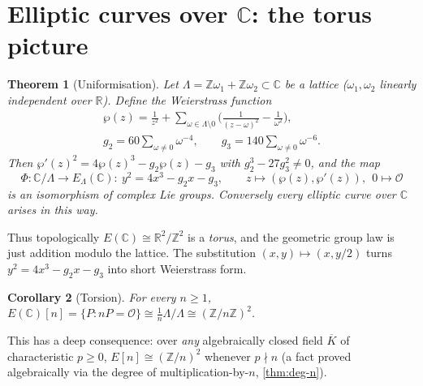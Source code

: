 \documentclass[11pt,a4paper,oneside]{book}
\theoremstyle{plain}
\newtheorem{theorem}{Theorem}[chapter]
\newtheorem{corollary}[theorem]{Corollary}
\theoremstyle{definition}
\theoremstyle{remark}
\newcommand{\Z}{\mathbb{Z}}
\newcommand{\R}{\mathbb{R}}
\newcommand{\C}{\mathbb{C}}
\newcommand{\Oinf}{\mathcal{O}}
\newcommand{\Kbar}{\overline{K}}
\begin{document}
\section{Elliptic curves over \texorpdfstring{$\C$}{C}: the torus picture}

\begin{theorem}[Uniformisation]\label{thm:uniformisation}
Let $\Lambda=\Z\omega_1+\Z\omega_2\subset\C$ be a lattice ($\omega_1,\omega_2$ linearly independent over $\R$). Define the Weierstrass function
\begin{gather*}
\wp(z)=\frac1{z^2}+\sum_{\omega\in\Lambda\setminus0}\Big(\frac1{(z-\omega)^2}-\frac1{\omega^2}\Big),\\
g_2=60\sum_{\omega\ne0}\omega^{-4},\qquad g_3=140\sum_{\omega\ne0}\omega^{-6}.
\end{gather*}
Then $\wp'(z)^2=4\wp(z)^3-g_2\wp(z)-g_3$ with $g_2^3-27g_3^2\ne0$, and the map
\[
\Phi:\C/\Lambda\longrightarrow E_\Lambda(\C):\ y^2=4x^3-g_2x-g_3,\qquad z\mapsto(\wp(z),\wp'(z)),\ \ 0\mapsto\Oinf
\]
is an isomorphism of complex Lie groups. Conversely every elliptic curve over $\C$ arises in this way.
\end{theorem}

Thus topologically $E(\C)\cong\R^2/\Z^2$ is a \emph{torus}, and the geometric group law is just addition modulo the lattice.
The substitution $(x,y)\mapsto(x,y/2)$ turns $y^2=4x^3-g_2x-g_3$ into short Weierstrass form.

\begin{corollary}[Torsion]\label{cor:torsion-C}
For every $n\ge1$, $E(\C)[n]=\{P:nP=\Oinf\}\cong\tfrac1n\Lambda/\Lambda\cong(\Z/n\Z)^2$.
\end{corollary}

This has a deep consequence: over \emph{any} algebraically closed field $\Kbar$ of characteristic $p\ge0$,
$E[n]\cong(\Z/n)^2$ whenever $p\nmid n$ (a fact proved algebraically via the degree of multiplication-by-$n$, \cref{thm:deg-n}).
\end{document}
